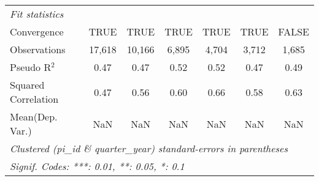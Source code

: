\begin{tabular}{lcccccc}
   \midrule
   \emph{Fit statistics}\\
   Convergence                                                &TRUE     & TRUE    & TRUE          & TRUE          & TRUE          & FALSE\\  
   Observations                                               & 17,618  & 10,166  & 6,895         & 4,704         & 3,712         & 1,685\\  
   Pseudo R$^2$                                               & 0.47    & 0.47    & 0.52          & 0.52          & 0.47          & 0.49\\  
   Squared Correlation                                        & 0.47    & 0.56    & 0.60          & 0.66          & 0.58          & 0.63\\  
Mean(Dep. Var.) & NaN & NaN & NaN & NaN & NaN & NaN \\
   \midrule \midrule
   \multicolumn{7}{l}{\emph{Clustered (pi\_id \& quarter\_year) standard-errors in parentheses}}\\
   \multicolumn{7}{l}{\emph{Signif. Codes: ***: 0.01, **: 0.05, *: 0.1}}\\
\end{tabular}
\par\endgroup
